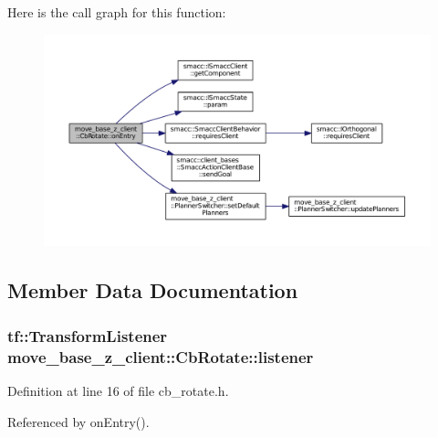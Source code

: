 Here is the call graph for this function\+:
\nopagebreak
\begin{figure}[H]
\begin{center}
\leavevmode
\includegraphics[width=350pt]{classmove__base__z__client_1_1CbRotate_a1528192ce89f2c1cbd9deffafecefb69_cgraph}
\end{center}
\end{figure}




\subsection{Member Data Documentation}
\subsubsection[{\texorpdfstring{listener}{listener}}]{\setlength{\rightskip}{0pt plus 5cm}tf\+::\+Transform\+Listener move\+\_\+base\+\_\+z\+\_\+client\+::\+Cb\+Rotate\+::listener}\hypertarget{classmove__base__z__client_1_1CbRotate_ad9afe4d39997d7b44fc304f81f519cc5}{}\label{classmove__base__z__client_1_1CbRotate_ad9afe4d39997d7b44fc304f81f519cc5}


Definition at line 16 of file cb\+\_\+rotate.\+h.



Referenced by on\+Entry().

